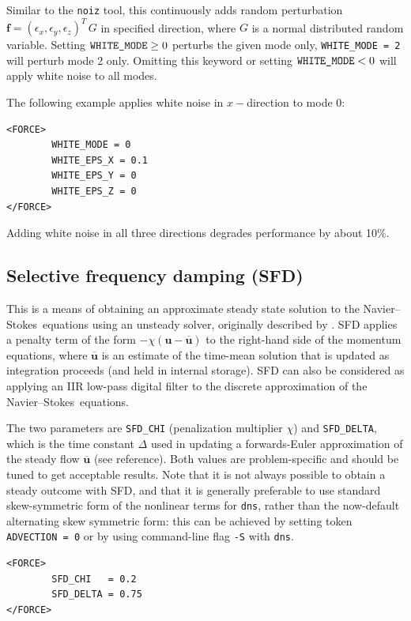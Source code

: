 \documentclass[11pt]{report}
\newcommand\NavSto{Navier--Stokes}
\begin{document}
Similar to the \verb+noiz+ tool, this continuously adds random
perturbation $\bm{f} = (\epsilon_x, \epsilon_y, \epsilon_z)^T\,G$ in
specified direction, where $G$ is a normal distributed random
variable. Setting $\verb+WHITE_MODE+ \ge 0$ perturbs the given mode
only, \ie \verb+WHITE_MODE = 2+ will perturb mode 2 only. Omitting
this keyword or setting $\verb+WHITE_MODE+ < 0$ will apply white noise
to all modes.

The following example applies white noise in $x-$direction to mode 0:
\begin{verbatim}
<FORCE>
        WHITE_MODE = 0
        WHITE_EPS_X = 0.1
        WHITE_EPS_Y = 0
        WHITE_EPS_Z = 0
</FORCE>
\end{verbatim}
Adding white noise in all three directions degrades performance by
about 10\%. 

\subsection{Selective frequency damping (SFD)}
\label{sec.sfd}

This is a means of obtaining an approximate steady state solution to
the \NavSto\ equations using an unsteady solver, originally described
by \citet{abhhms06}. SFD applies a penalty term of the form
$-\chi(\bm{u}-\overline{\bm{u}})$ to the right-hand side of the
momentum equations, where $\overline{\bm{u}}$ is an estimate of the
time-mean solution that is updated as integration proceeds (and held
in internal storage). SFD can also be considered as applying an IIR
low-pass digital filter to the discrete approximation of the
\NavSto\ equations.

The two parameters are \verb|SFD_CHI| (\ie penalization multiplier
$\chi$) and \verb|SFD_DELTA|, which is the time constant $\Delta$ used
in updating a forwards-Euler approximation of the steady flow
$\overline{\bm{u}}$ (see reference).  Both values are problem-specific
and should be tuned to get acceptable results.  Note that it is not
always possible to obtain a steady outcome with SFD, and that it is
generally preferable to use standard skew-symmetric form of the
nonlinear terms for \verb|dns|, rather than the now-default
alternating skew symmetric form: this can be achieved by setting token
\verb|ADVECTION = 0| or by using command-line flag \verb|-S| with
\verb|dns|.

\begin{verbatim}
<FORCE>
        SFD_CHI   = 0.2
        SFD_DELTA = 0.75
</FORCE>
\end{verbatim}
\end{document}
